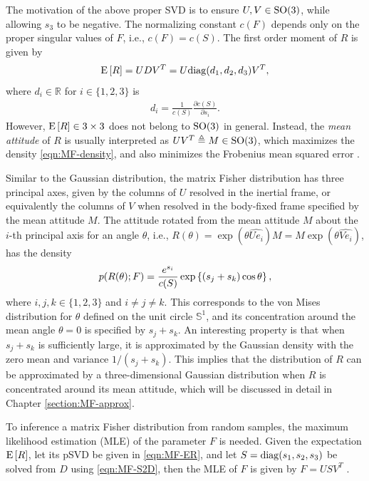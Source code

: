 The motivation of the above proper SVD is to ensure $U,V\in\mathrm{SO}(3)$, while allowing $s_3$ to be negative.
The normalizing constant $c(F)$ depends only on the proper singular values of $F$, i.e., $c(F) = c(S)$.
The first order moment of $R$ is given by 
\begin{gather} \label{eqn:MF-ER}
	\mathrm{E}\left[ R \right] = UDV^T = U\mathrm{diag}(d_1,d_2,d_3)V^T,
\end{gather}
where $d_i\in\mathbb{R}$ for $i\in\{1,2,3\}$ is
\begin{gather} \label{eqn:MF-S2D}
	d_i = \frac{1}{c(S)} \frac{\partial c(S)}{\partial s_i}.
\end{gather}
However, $\expect{R}\in\real{3\times 3}$  does not belong to $\mathrm{SO}(3)$ in general. 
Instead, the \textit{mean attitude} of $R$ is usually interpreted as $UV^T \triangleq M\in\mathrm{SO}(3)$, which maximizes the density \eqref{eqn:MF-density}, and also minimizes the Frobenius mean squared error \cite{lee2018bayesian}. 

Similar to the Gaussian distribution, the matrix Fisher distribution has three principal axes, given by the columns of $U$ resolved in the inertial frame, or equivalently the columns of $V$ when resolved in the body-fixed frame specified by the mean attitude $M$.
The attitude rotated from the mean attitude $M$ about the $i$-th principal axis for an angle $\theta$, i.e., $R(\theta) = \exp(\theta\widehat{Ue_i})M = M\exp(\theta\widehat{Ve_i})$, has the density
\begin{equation} \label{eqn:MF-density-principal}
	p(R(\theta);F) = \frac{e^{s_i}}{c(S)}\exp\left\{ (s_j+s_k)\cos\theta \right\},
\end{equation}
where $i,j,k\in\{1,2,3\}$ and $i\neq j\neq k$.
This corresponds to the von Mises distribution for $\theta$ defined on the unit circle $\mathbb{S}^1$, and its concentration around the mean angle $\theta=0$ is specified by $s_j+s_k$.
An interesting property is that when $s_j+s_k$ is sufficiently large, it is approximated by the Gaussian density with the zero mean and variance $1/(s_j+s_k)$.
This implies that the distribution of $R$ can be approximated by a three-dimensional Gaussian distribution when $R$ is concentrated around its mean attitude, which will be discussed in detail in Chapter \ref{section:MF-approx}.

To inference a matrix Fisher distribution from random samples, the maximum likelihood estimation (MLE) of the parameter $F$ is needed.
Given the expectation $\mathrm{E}\left[ R \right]$, let its pSVD be given in \eqref{eqn:MF-ER}, and let $S = \mathrm{diag}(s_1,s_2,s_3)$ be solved from $D$ using \eqref{eqn:MF-S2D},
then the MLE of $F$ is given by $F=USV^T$ \cite{khatri1977mises,lee2018bayesian}.

